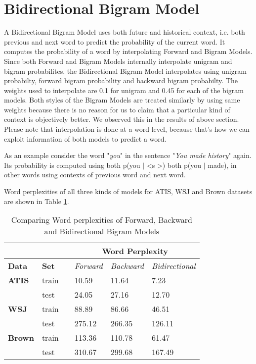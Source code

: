 \documentclass{article}
\begin{document}
\section{Bidirectional Bigram Model}
A Bidirectional Bigram Model uses both future and historical context, i.e. both previous and next word to predict the probability of the current word. It computes the probability of a word by interpolating Forward and Bigram Models. Since both Forward and Bigram Models internally interpolate unigram and bigram probabilites, the Bidirectional Bigram Model interpolates using unigram probabilty, forward bigram probability and backward bigram probabilty. The weights used to interpolate are 0.1 for unigram and 0.45 for each of the bigram models. Both styles of the Bigram Models are treated similarly by using same weights because there is no reason for us to claim that a particular kind of context is objectively better. We observed this in the results of above section. Please note that interpolation is done at a word level, because that's how we can exploit information of both models to predict a word.

As an example consider the word "\textit{you}" in the sentence "\textit{You made history}" again. Its probability is computed using both p(you $|$ \textless s \textgreater) both p(you $|$ made), in other words using contexts of previous word and next word.

Word perplexities of all three kinds of models for ATIS, WSJ and Brown datasets are shown in Table \ref{all}.
\begin{table}[h]
\centering
\begin{tabular}{@{}llllll@{}}
\toprule
\textbf{}      & \textbf{}    &  & \multicolumn{3}{c}{\textbf{Word Perplexity}}                  \\ \midrule
\textbf{Data}  & \textbf{Set} &  & \textit{Forward} & \textit{Backward} & \textit{Bidirectional} \\ \midrule
\textbf{ATIS}  & train        &  & 10.59           & 11.64             & 7.23                  \\ \midrule
               & test         &  & 24.05           & 27.16            & 12.70                 \\ \midrule
\textbf{WSJ}   & train        &  & 88.89           & 86.66            & 46.51                 \\ \midrule
               & test         &  & 275.12           & 266.35           & 126.11                \\ \midrule
\textbf{Brown} & train        &  & 113.36          & 110.78            & 61.47                  \\ \midrule
               & test         &  & 310.67          & 299.68           & 167.49               \\ \bottomrule
\end{tabular}
\caption{Comparing Word perplexities of Forward, Backward and Bidirectional Bigram Models}
\label{all}
\end{table}
\end{document}
